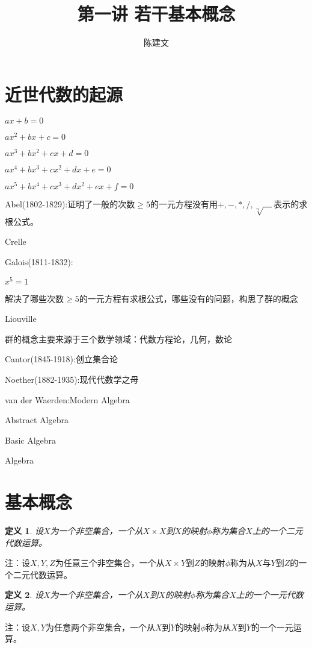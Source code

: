 \documentclass{article}
\newtheorem{Def}{定义}
\begin{document}
\begin{CJK*}{UTF8}{gbsn}
  \title{第一讲 若干基本概念}
  \author{陈建文}
  \maketitle
  \section{近世代数的起源}


$ax+b=0$

$ax^2+bx+c=0$

$ax^3+bx^2+cx+d=0$

$ax^4+bx^3+cx^2+dx+e=0$

$ax^5+bx^4+cx^3+dx^2+ex+f=0$

Abel(1802-1829):证明了一般的次数$\geq 5$的一元方程没有用$+,-,*,/,\sqrt[n]{\quad}$表示的求根公式。

Crelle

Galois(1811-1832):

$x^5=1$

解决了哪些次数$\geq 5$的一元方程有求根公式，哪些没有的问题，构思了群的概念

Liouville

群的概念主要来源于三个数学领域：代数方程论，几何，数论

Cantor(1845-1918):创立集合论

Noether(1882-1935):现代代数学之母

van der Waerden:Modern Algebra

Abstract Algebra

Basic Algebra

Algebra



\section{基本概念}
\begin{Def}
  设$X$为一个非空集合，一个从$X\times X$到$X$的映射$\phi$称为集合$X$上的一个二元代数运算。
\end{Def}
  
注：设$X,Y,Z$为任意三个非空集合，一个从$X\times Y$到$Z$的映射$\phi$称为从$X$与$Y$到$Z$的一个二元代数运算。

\begin{Def}
  设$X$为一个非空集合，一个从$X$到$X$的映射$\phi$称为集合$X$上的一个一元代数运算。
\end{Def}

注：设$X,Y$为任意两个非空集合，一个从$X$到$Y$的映射$\phi$称为从$X$到$Y$的一个一元运算。


\end{CJK*}
\end{document}
